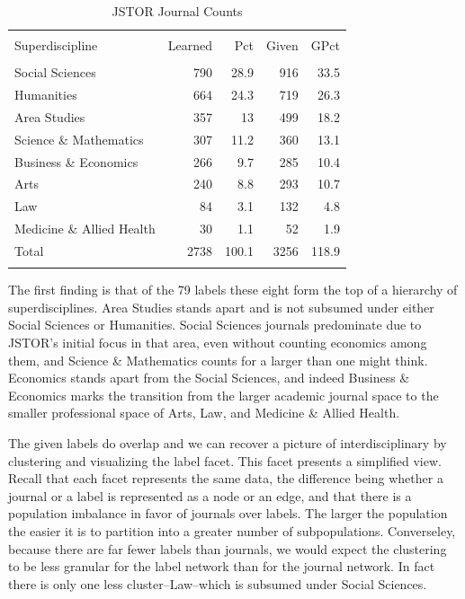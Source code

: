 \documentclass[]{book}
\theoremstyle{definition}
\theoremstyle{definition}
\theoremstyle{definition}
\theoremstyle{remark}
\begin{document}
\begin{table}[!htbp] \centering 
  \caption{JSTOR Journal Counts} 
  \label{tab:jclu-tab-sup} 
\begin{tabular}{@{\extracolsep{5pt}} lrrrr} 
\\[-1.8ex]\hline 
\hline \\[-1.8ex] 
Superdiscipline & Learned & Pct & Given & GPct \\ 
\hline \\[-1.8ex] 
Social Sciences & 790 & 28.9 & 916 & 33.5 \\ 
Humanities & 664 & 24.3 & 719 & 26.3 \\ 
Area Studies & 357 & 13 & 499 & 18.2 \\ 
Science \& Mathematics & 307 & 11.2 & 360 & 13.1 \\ 
Business \& Economics & 266 & 9.7 & 285 & 10.4 \\ 
Arts & 240 & 8.8 & 293 & 10.7 \\ 
Law & 84 & 3.1 & 132 & 4.8 \\ 
Medicine \& Allied Health & 30 & 1.1 & 52 & 1.9 \\ 
Total & 2738 & 100.1 & 3256 & 118.9 \\ 
\hline \\[-1.8ex] 
\end{tabular} 
\end{table}

The first finding is that of the 79 labels these eight form the top of a
hierarchy of superdisciplines. Area Studies stands apart and is not
subsumed under either Social Sciences or Humanities. Social Sciences
journals predominate due to JSTOR's initial focus in that area, even
without counting economics among them, and Science \& Mathematics counts
for a larger than one might think. Economics stands apart from the
Social Sciences, and indeed Business \& Economics marks the transition
from the larger academic journal space to the smaller professional space
of Arts, Law, and Medicine \& Allied Health.

The given labels do overlap and we can recover a picture of
interdisciplinary by clustering and visualizing the label facet. This
facet presents a simplified view. Recall that each facet represents the
same data, the difference being whether a journal or a label is
represented as a node or an edge, and that there is a population
imbalance in favor of journals over labels. The larger the population
the easier it is to partition into a greater number of subpopulations.
Converseley, because there are far fewer labels than journals, we would
expect the clustering to be less granular for the label network than for
the journal network. In fact there is only one less cluster--Law--which
is subsumed under Social Sciences.
\end{document}
